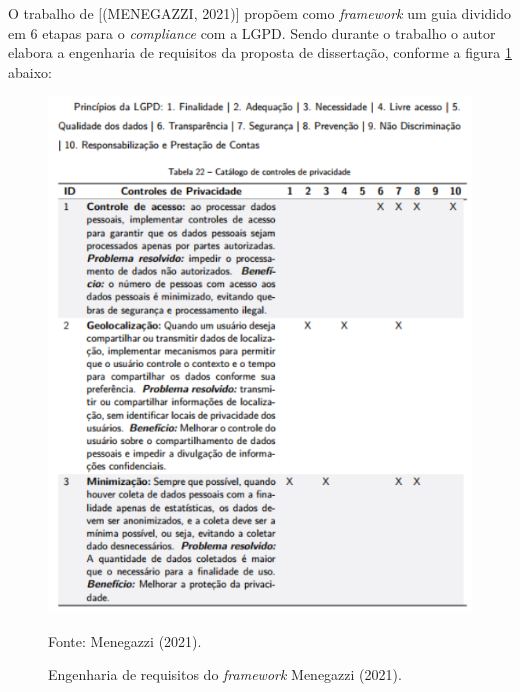 \documentclass[
	12pt,				%
	openright,			%
	oneside,			%
	a4paper,			%
	english,			%
	french,				%
	spanish,			%
	brazil,				%
	]{abntex2}
\begin{document}
O trabalho de [(MENEGAZZI, 2021)] propõem como \textit{framework}  um guia dividido em 6 etapas para o \textit{compliance} com a LGPD. Sendo durante o trabalho o autor elabora a engenharia de requisitos da proposta de dissertação, conforme a figura \ref{fig: Menegazzi } abaixo: 

\begin{figure}[ht]
    \centering
    \caption{Engenharia de requisitos do \textit{framework} Menegazzi (2021).}
    \includegraphics[width=5.0in]{Images/09Menegazzi.png}
    \label{fig: Menegazzi }
    
    \centering \small Fonte: Menegazzi (2021).
\end{figure}
\end{document}
